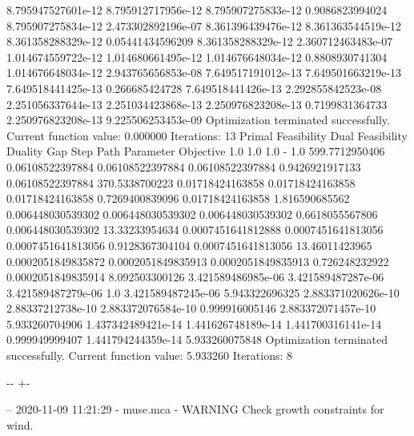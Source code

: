 \documentclass[letterpaper,10pt,english]{sphinxmanual}
\newlength\nbsphinxcodecellspacing
\begin{document}
{\begin{sphinxVerbatim}[commandchars=\\\{\}]
8.795947527601e-12  8.795912717956e-12  8.795907275833e-12  0.9086823994024  8.795907275834e-12  2.473302892196e-07
8.361396439476e-12  8.361363544519e-12  8.361358288329e-12  0.05441434596209 8.361358288329e-12  2.360712463483e-07
1.014674559722e-12  1.014680661495e-12  1.014676648034e-12  0.8808930741304  1.014676648034e-12  2.943765656853e-08
7.649517191012e-13  7.649501663219e-13  7.649518441425e-13  0.266685424728   7.649518441426e-13  2.292855842523e-08
2.251056337644e-13  2.251034423868e-13  2.250976823208e-13  0.7199831364733  2.250976823208e-13  9.225506253453e-09
Optimization terminated successfully.
         Current function value: 0.000000
         Iterations: 13
Primal Feasibility  Dual Feasibility    Duality Gap         Step             Path Parameter      Objective
1.0                 1.0                 1.0                 -                1.0                 599.7712950406
0.06108522397884    0.06108522397884    0.06108522397884    0.9426921917133  0.06108522397884    370.5338700223
0.01718424163858    0.01718424163858    0.01718424163858    0.7269400839096  0.01718424163858    1.816590685562
0.006448030539302   0.006448030539302   0.006448030539302   0.6618055567806  0.006448030539302   13.33233954634
0.0007451641812888  0.0007451641813056  0.0007451641813056  0.9128367304104  0.0007451641813056  13.46011423965
0.0002051849835872  0.0002051849835913  0.0002051849835913  0.726248232922   0.0002051849835914  8.092503300126
3.421589486985e-06  3.421589487287e-06  3.421589487279e-06  1.0              3.421589487245e-06  5.943322696325
2.883371020626e-10  2.88337212738e-10   2.883372076584e-10  0.999916005146   2.883372071457e-10  5.933260704906
1.437342489421e-14  1.441626748189e-14  1.441700316141e-14  0.999949999407   1.441794244359e-14  5.933260075848
Optimization terminated successfully.
         Current function value: 5.933260
         Iterations: 8
\end{sphinxVerbatim}
}

{

\kern-\sphinxverbatimsmallskipamount\kern-\baselineskip
\kern+\FrameHeightAdjust\kern-\fboxrule
\vspace{\nbsphinxcodecellspacing}

\begin{sphinxVerbatim}[commandchars=\\\{\}]
-- 2020-11-09 11:21:29 - muse.mca - WARNING
Check growth constraints for wind.

\end{sphinxVerbatim}
}
\end{document}
